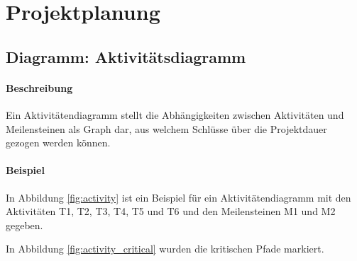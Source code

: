 \documentclass[a4paper, 11pt, accentcolor = tud3b]{tudreport}
\begin{document}
		\section{Projektplanung}
			\subsection{Diagramm: Aktivitätsdiagramm}
				\label{diagram:activity}

				\paragraph{Beschreibung}
					Ein Aktivitätendiagramm stellt die Abhängigkeiten zwischen Aktivitäten und Meilensteinen als Graph dar, aus welchem Schlüsse über die Projektdauer gezogen werden können.
				
				\paragraph{Beispiel}
					In Abbildung \ref{fig:activity} ist ein Beispiel für ein Aktivitätendiagramm mit den Aktivitäten T1, T2, T3, T4, T5 und T6 und den Meilensteinen M1 und M2 gegeben.
					
					In Abbildung \ref{fig:activity_critical} wurden die kritischen Pfade markiert.
\end{document}
